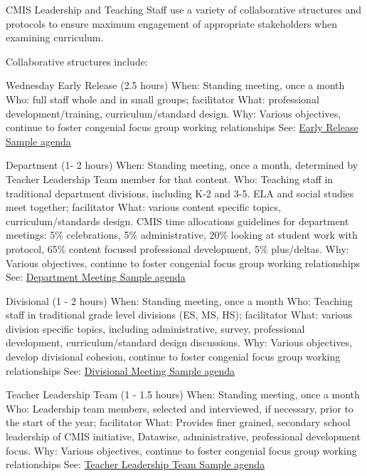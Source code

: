 \begin{findings}

CMIS Leadership and Teaching Staff use a variety of collaborative structures and protocols to ensure maximum engagement of appropriate stakeholders when examining curriculum. 

Collaborative structures include: 

Wednesday Early Release (2.5 hours)
When: Standing meeting, once a month 
Who: full staff whole and in small groups; facilitator 
What: professional development/training, curriculum/standard design. 
Why: Various objectives, continue to foster congenial focus group working relationships
See: \href{https://docs.google.com/a/cmis.ac.th/document/d/1RoLU6YF794M-w835lARCN-PAiZ18xGDlbtLd93Qvkqc/edit?usp=sharing}{Early Release Sample agenda}

Department (1- 2 hours)
When: Standing meeting, once a month, determined by Teacher Leadership Team member for that content. 
Who: Teaching staff in traditional department divisions, including K-2 and 3-5. ELA and social studies meet together; facilitator 
What: various content specific topics, curriculum/standards design. CMIS time allocations guidelines for department meetings: 5\% celebrations, 5\% administrative, 20\% looking at student work with protocol, 65\% content focused professional development, 5\% plus/deltas. 
Why: Various objectives, continue to foster congenial focus group working relationships
See: \href{https://docs.google.com/a/cmis.ac.th/document/d/1umDrBbwhE8UFXVo4s6ytS6Ykxf4uJRs0MFSvgQewjys/edit?usp=sharing}{Department Meeting Sample agenda}

Divisional (1 - 2 hours) 
When: Standing meeting, once a month 
Who: Teaching staff in traditional grade level divisions (ES, MS, HS); facilitator 
What: various division specific topics, including administrative, survey, professional development, curriculum/standard design discussions. 
Why: Various objectives, develop divisional cohesion, continue to foster congenial focus group working relationships
See: \href{https://docs.google.com/a/cmis.ac.th/document/d/1xT0xZBYBEuu4zlg_DwGHZVET8WsdoTLphRXPJUNN6_o/edit?usp=sharing}{Divisional Meeting Sample agenda} 

Teacher Leadership Team (1 - 1.5 hours)
When: Standing meeting, once a month
Who: Leadership team members, selected and interviewed, if necessary, prior to the start of the year; facilitator 
What: Provides finer grained, secondary school leadership of CMIS initiative, Datawise, administrative, professional development focus. 
Why: Various objectives, continue to foster congenial focus group working relationships
See: \href{https://docs.google.com/a/cmis.ac.th/document/d/1M88mpMIEkx65JUSplvQMWfN6l8ur3fwpKrgzN97Hq8g/edit?usp=sharing}{Teacher Leadership Team Sample agenda} 


\end{findings}
